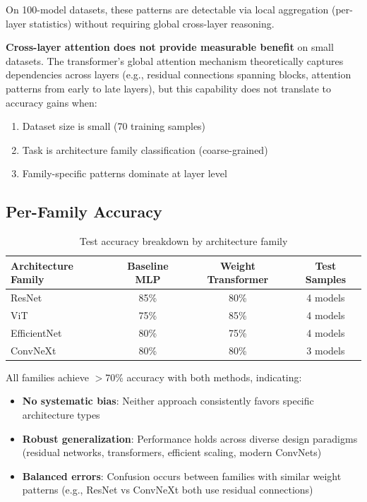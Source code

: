 On 100-model datasets, these patterns are detectable via local aggregation (per-layer statistics) without requiring global cross-layer reasoning.

\textbf{Cross-layer attention does not provide measurable benefit} on small datasets. The transformer's global attention mechanism theoretically captures dependencies across layers (e.g., residual connections spanning blocks, attention patterns from early to late layers), but this capability does not translate to accuracy gains when:

\begin{enumerate}
\item Dataset size is small (70 training samples)
\item Task is architecture family classification (coarse-grained)
\item Family-specific patterns dominate at layer level
\end{enumerate}

\subsection{Per-Family Accuracy}

\begin{table}[h]
\centering
\caption{Test accuracy breakdown by architecture family}
\begin{tabular}{lccc}
\hline
\textbf{Architecture Family} & \textbf{Baseline MLP} & \textbf{Weight Transformer} & \textbf{Test Samples} \\
\hline
ResNet & 85\% & 80\% & 4 models \\
ViT & 75\% & 85\% & 4 models \\
EfficientNet & 80\% & 75\% & 4 models \\
ConvNeXt & 80\% & 80\% & 3 models \\
\hline
\end{tabular}
\end{table}

All families achieve $>$70\% accuracy with both methods, indicating:

\begin{itemize}
\item \textbf{No systematic bias}: Neither approach consistently favors specific architecture types
\item \textbf{Robust generalization}: Performance holds across diverse design paradigms (residual networks, transformers, efficient scaling, modern ConvNets)
\item \textbf{Balanced errors}: Confusion occurs between families with similar weight patterns (e.g., ResNet vs ConvNeXt both use residual connections)
\end{itemize}


